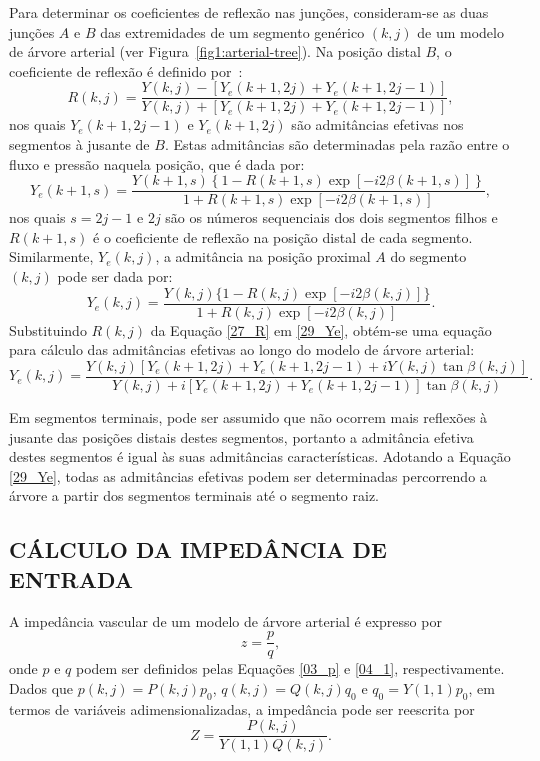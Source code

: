 Para determinar os coeficientes de reflexão nas junções, consideram-se as duas junções $A$ e $B$ das extremidades de um segmento genérico $(k,j)$ de um modelo de árvore arterial (ver Figura~\ref{fig1:arterial-tree}). Na posição distal $B$, o coeficiente de reflexão é definido por~\cite{Fung,Lighthill}:
\begin{equation}
	R(k,j) = \frac{Y(k,j) - [Y_e(k+1,2j) + Y_e(k+1,2j-1)]}{Y(k,j) + [Y_e(k+1,2j) + Y_e(k+1,2j-1)]},
	\label{27_R}
\end{equation}
nos quais $Y_e(k+1,2j-1)$ e $Y_e(k+1,2j)$ são admitâncias efetivas nos segmentos à jusante de $B$. Estas admitâncias são determinadas pela razão entre o fluxo e pressão naquela posição, que é dada por:
\begin{equation}
	Y_e(k+1,s) = \frac{Y(k+1,s)\left\{1 - R(k+1,s)\exp{[-i2\beta(k+1,s)]}\right\}}{1 + R(k+1,s)\exp{[-i2\beta(k+1,s)]}},
	\label{28_Ye}
\end{equation}
nos quais $s = 2j-1$ e $2j$ são os números sequenciais dos dois segmentos filhos e $R(k+1,s)$ é o coeficiente de reflexão na posição distal de cada segmento. Similarmente, $Y_e(k,j)$, a admitância na posição proximal $A$ do segmento $(k,j)$ pode ser dada por:
\begin{equation}
	Y_e(k,j) = \frac{Y(k,j)\{1 - R(k,j)\exp{[-i2\beta(k,j)]}\} }{1 + R(k,j)\exp{[-i2\beta(k,j)]}}
	\label{29_Ye}.
\end{equation}
Substituindo $R(k,j)$ da Equação \eqref{27_R} em \eqref{29_Ye}, obtém-se  uma equação para cálculo das admitâncias efetivas ao longo do modelo de árvore arterial:
\begin{equation}
	Y_e(k,j) = \frac{Y(k,j) [Y_e(k+1,2j) + Y_e(k+1,2j-1)+ i Y(k,j)\tan{\beta(k,j)}]}{Y(k,j) + i[Y_e(k+1,2j) + Y_e(k+1,2j-1)]\tan{\beta(k,j)}}.
	\label{30_Ye}
\end{equation}

Em segmentos terminais, pode ser assumido que não ocorrem mais reflexões à jusante das posições distais destes segmentos, portanto a admitância efetiva destes segmentos é igual às suas admitâncias características. Adotando a Equação \eqref{29_Ye}, todas as admitâncias efetivas podem ser determinadas percorrendo a árvore a partir dos segmentos terminais até o segmento raiz.

\subsection{CÁLCULO DA IMPEDÂNCIA DE ENTRADA}

A impedância vascular de um modelo de árvore arterial é expresso por
\begin{equation}
	z = \frac{p}{q},
\end{equation}
onde $p$ e $q$ podem ser definidos pelas Equações \eqref{03_p} e \eqref{04_1}, respectivamente. Dados que $p(k,j) = P(k,j) p_0$, $q(k,j) = Q(k,j) q_0$ e $q_0 = Y(1,1) p_0$, em termos de variáveis adimensionalizadas, a impedância pode ser reescrita por
\begin{equation}
	Z = \frac{P(k,j)}{Y(1,1) Q(k,j)}.
\end{equation}

